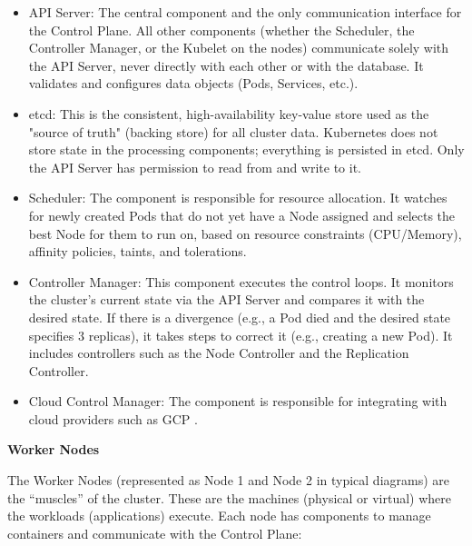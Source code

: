 \begin{itemize}
    \item API Server: The central component and the only communication interface for the Control Plane. All other components (whether the Scheduler, the Controller Manager, or the Kubelet on the nodes) communicate solely with the API Server, never directly with each other or with the database. It validates and configures data objects (Pods, Services, etc.).
    \item etcd: This is the consistent, high-availability key-value store used as the "source of truth" (backing store) for all cluster data. Kubernetes does not store state in the processing components; everything is persisted in etcd. Only the API Server has permission to read from and write to it.
    \item Scheduler: The component is responsible for resource allocation. It watches for newly created Pods that do not yet have a Node assigned and selects the best Node for them to run on, based on resource constraints (CPU/Memory), affinity policies, taints, and tolerations.
    \item Controller Manager: This component executes the control loops. It monitors the cluster's current state via the API Server and compares it with the desired state. If there is a divergence (e.g., a Pod died and the desired state specifies 3 replicas), it takes steps to correct it (e.g., creating a new Pod). It includes controllers such as the Node Controller and the Replication Controller.
    \item Cloud Control Manager: The component is responsible for integrating with cloud providers such as GCP \cite{kubernetes_components_2019}.
\end{itemize}

\textbf{Worker Nodes}

The Worker Nodes (represented as Node 1 and Node 2 in typical diagrams) are the ``muscles'' of the cluster. These are the machines (physical or virtual) where the workloads (applications) execute. Each node has components to manage containers and communicate with the Control Plane:

